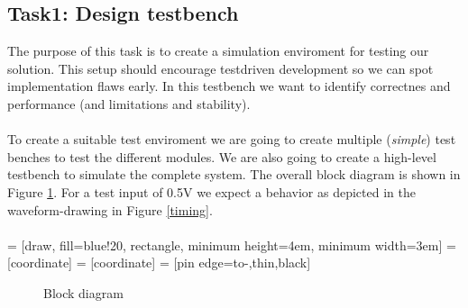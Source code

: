 \documentclass[english, 12pt, a4paper]{article}
\begin{document}
\subsection*{Task1: Design testbench}
The purpose of this task is to create a simulation enviroment for testing our solution. This setup should encourage testdriven development so we can spot implementation flaws early.
In this testbench we want to identify correctnes and performance (and limitations and stability).\\
\\
To create a suitable test enviroment we are going to create multiple (\textit{simple}) test benches to test the different modules.
We are also going to create a high-level testbench to simulate the complete system. The overall block diagram is shown in Figure \ref{block_diagram}. 
For a test input of 0.5V we expect a behavior as depicted in the waveform-drawing in Figure \ref{timing}.\\
\\
 = [draw, fill=blue!20, rectangle, 
    minimum height=4em, minimum width=3em]
 = [coordinate]
 = [coordinate]
 = [pin edge={to-,thin,black}]
\begin{figure}
  \caption{Block diagram}
  \label{block_diagram}
\end{figure}
\end{document}
